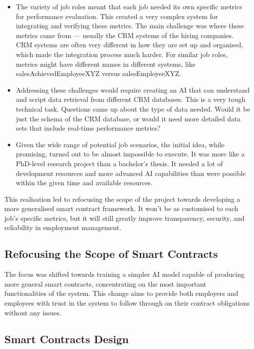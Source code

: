 \begin{itemize}
    \item The variety of job roles meant that each job needed its own specific metrics for performance evaluation. This created a very complex system for integrating and verifying these metrics. The main challenge was where these metrics came from — usually the CRM systems of the hiring companies. CRM systems are often very different in how they are set up and organised, which made the integration process much harder. For similar job roles, metrics might have different names in different systems, like salesAchievedEmployeeXYZ versus salesEmployeeXYZ.
    \item Addressing these challenges would require creating an AI that can understand and script data retrieval from different CRM databases. This is a very tough technical task. Questions came up about the type of data needed. Would it be just the schema of the CRM database, or would it need more detailed data sets that include real-time performance metrics?
    \item Given the wide range of potential job scenarios, the initial idea, while promising, turned out to be almost impossible to execute. It was more like a PhD-level research project than a bachelor's thesis. It needed a lot of development resources and more advanced AI capabilities than were possible within the given time and available resources.
\end{itemize}

This realisation led to refocusing the scope of the project towards developing a more generalised smart contract framework. It won't be as customised to each job's specific metrics, but it will still greatly improve transparency, security, and reliability in employment management.

\subsection{Refocusing the Scope of Smart Contracts}

The focus was shifted towards training a simpler AI model capable of producing more general smart contracts, concentrating on the most important functionalities of the system. This change aims to provide both employers and employees with trust in the system to follow through on their contract obligations without any issues.

\subsection{Smart Contracts Design}

